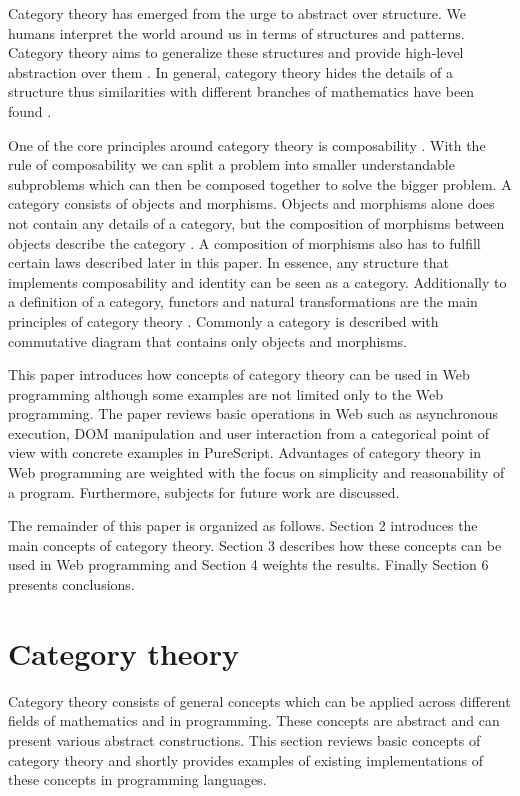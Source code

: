 \documentclass[article]{aaltoseries}
\begin{document}
  Category theory has emerged from the urge to abstract over structure. We
  humans interpret the world around us in terms of structures and patterns.
  Category theory aims to generalize these structures and provide high-level
  abstraction over them \cite{eilenberg1945general}. In general, category theory
  hides the details of a structure thus similarities with different branches of
  mathematics have been found \cite{lawvere1996adjointness}.

  One of the core principles around category theory is composability
  \cite{barr1990category}. With the rule of composability we can split a problem
  into smaller understandable subproblems which can then be composed together to
  solve the bigger problem. A category consists of objects and morphisms.
  Objects and morphisms alone does not contain any details of a category, but
  the composition of morphisms between objects describe the category
  \cite{barr1990category, computational}. A composition of morphisms also has to
  fulfill certain laws described later in this paper. In essence, any structure
  that implements composability and identity can be seen as a category.
  Additionally to a definition of a category, functors and natural transformations
  are the main principles of category theory \cite{awodey2006category,
    computational}. Commonly a category is described with commutative diagram
  that contains only objects and morphisms.
 
  This paper introduces how concepts of category theory can be used in Web
  programming although some examples are not limited only to the Web programming.
  The paper reviews basic operations in Web such as asynchronous execution, DOM
  manipulation and user interaction from a categorical point of view with
  concrete examples in PureScript. Advantages of category theory in Web
  programming are weighted with the focus on simplicity and reasonability of a
  program. Furthermore, subjects for future work are discussed.
 
  The remainder of this paper is organized as follows. Section 2 introduces the
  main concepts of category theory. Section 3 describes how these concepts can
  be used in Web programming and Section 4 weights the results. Finally Section
  6 presents conclusions.


\section{Category theory}
Category theory consists of general concepts which can be applied across
different fields of mathematics and in programming. These concepts are abstract
and can present various abstract constructions. This section reviews
basic concepts of category theory and shortly provides examples of existing
implementations of these concepts in programming languages.
\end{document}
